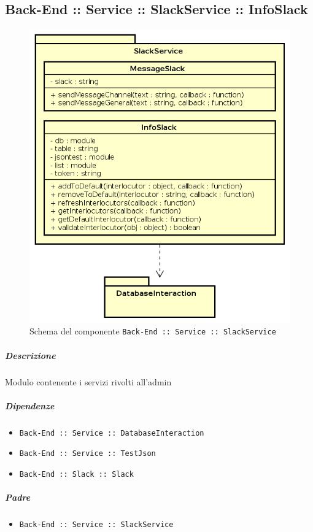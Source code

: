 \documentclass[../ManualeSviluppatore_v2.0.0.tex]{subfiles}
\begin{document}
\subsection{Back-End :: Service :: SlackService :: InfoSlack}
\begin{figure}[!h]
	\centering
	\includegraphics[scale=0.6]{Architettura/Back-End/Service/SlackService.png}
	\caption{Schema del componente \texttt{Back-End :: Service :: SlackService}}
\end{figure}
\subparagraph{Descrizione} Modulo contenente i servizi rivolti all'admin
\subparagraph{Dipendenze}
\begin{itemize}
	\item \texttt{Back-End :: Service :: DatabaseInteraction}
	\item \texttt{Back-End :: Service :: TestJson}
	\item \texttt{Back-End :: Slack :: Slack}
\end{itemize}
\subparagraph{Padre}
\begin{itemize}
	\item \texttt{Back-End :: Service :: SlackService}
\end{itemize}
\end{document}
